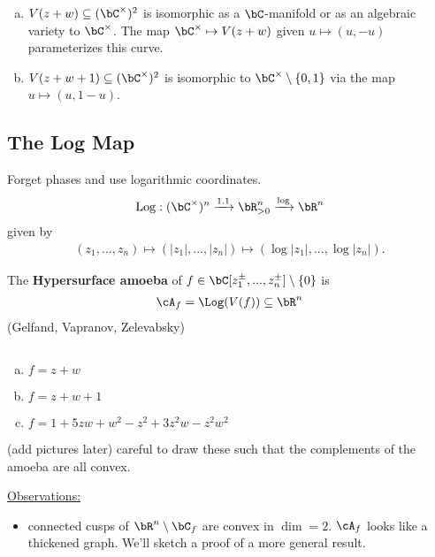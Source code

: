 \begin{example}\label{example:complex-hypersurface}
  $ $
  \begin{enumerate}[(a)]
    \item $V(z+w) \subseteq (\bC^\times)^2$ is isomorphic as a $\bC$-manifold or as an algebraic variety to $\bC^\times$. The map $\bC^\times \mapsto V(z+w)$  given $u\mapsto (u,-u)$ parameterizes this curve.
    \item $V(z+w+1) \subseteq (\bC^\times)^2$ is isomorphic to $\bC^\times\setminus\{0,1\}$  via the map $u \mapsto (u,1-u)$.
  \end{enumerate}
\end{example}

\subsection{The Log Map} Forget phases and use logarithmic coordinates. 
\begin{align*}
  \operatorname{Log}: (\bC^\times)^n \xrightarrow{1.1} \bR_{> 0}^n \xrightarrow{\log} \bR^n
\end{align*}
given by
\begin{align*}
  (z_1,...,z_n) \mapsto (|z_1|,...,|z_n|) \mapsto (\log|z_1|,...,\log |z_n|).
\end{align*}
\begin{defn}\label{defn:hypersurface-amoeba}
  The \textbf{Hypersurface amoeba} of $f\in \bC[z_1^{\pm},...,z_n^{\pm}]\setminus\{0\}$ is 
  \begin{align*}
    \cA_f = \Log(V(f)) \subseteq \bR^n
  \end{align*}
  (Gelfand, Vapranov, Zelevabsky)
\end{defn}
\begin{example}\label{example}
  $ $
\begin{enumerate}[(a)]
  \item $f = z + w$
  \item $f = z + w + 1$
  \item $f = 1 + 5zw + w^2 - z^2 + 3z^2w - z^2w^2$
\end{enumerate}
(add pictures later) careful to draw these such that the complements of the amoeba are all convex.
\end{example}

\bigskip

\underline{Observations:}
\begin{itemize}
  \item connected cusps of $\bR^n \setminus \bC_f$ are convex in $\dim = 2$. $\cA_f$ looks like a thickened graph. We'll sketch a proof of a more general result.
\end{itemize}

